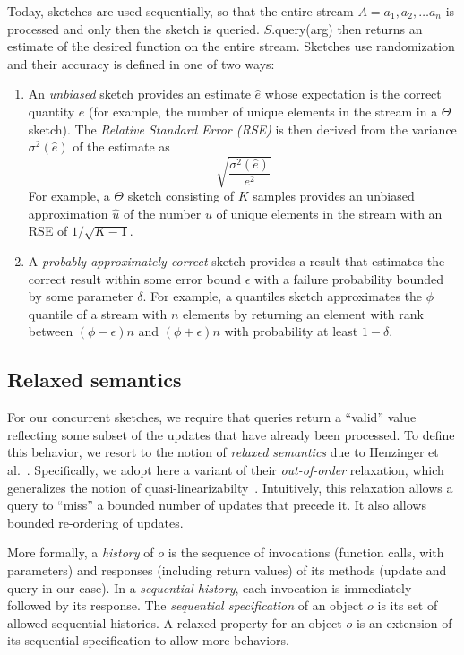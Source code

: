 Today, sketches are used sequentially, so that the entire stream $A = a_1, a_2, \dots a_n$ is processed 
and only then the sketch is queried. $S$.query(arg) then returns an estimate of the desired function 
on the entire stream. 
Sketches use randomization and their accuracy is defined in one of two ways:
\begin{enumerate}
\item An \emph{unbiased} sketch provides an estimate  $\hat{e}$ whose expectation is the correct quantity $e$ 
(for example, the number of unique elements in the stream in a $\Theta$ sketch).  
The \emph{Relative Standard Error (RSE)} is then derived from the variance $\sigma^2(\hat{e})$  of the estimate
as 
\[ \sqrt {\frac{\sigma^2(\hat{e})}{e^2}} \]
For example, a $\Theta$ sketch consisting of  $K$ samples provides an unbiased approximation $\hat{u}$ of the 
number $u$ of unique elements in the stream with an RSE of $1/\sqrt{K-1}$.

\item A \emph{probably approximately correct} sketch provides a result that estimates the correct result
within some error bound $\epsilon$ with a failure probability bounded by some parameter $\delta$.  
For example, a quantiles sketch approximates the $\phi$ quantile of a stream with  $n$ elements 
by returning an element with rank between $(\phi-\epsilon)n$ and  $(\phi+\epsilon)n$ with 
probability at least $1-\delta$.

\end{enumerate} 

\subsection{Relaxed semantics}
\label{sec:rsemantics}

For our concurrent sketches, we require that queries return a ``valid'' value reflecting some subset of the updates that have 
already been processed. %
To define this behavior, we resort to the notion of \emph{relaxed semantics}  due to Henzinger et al.~\cite{Henzinger}.
Specifically, we adopt here a variant of their {\emph{out-of-order}} relaxation,  
which generalizes the notion of quasi-linearizabilty~\cite{Afek}.
Intuitively, this relaxation allows a query to ``miss'' a bounded number of updates that precede it.
It also allows bounded re-ordering of updates.

More formally, 
a \emph{history} of $o$ is the sequence of invocations (function calls, with parameters) and responses 
(including return values) of its methods (update and query in our case). %
In a \emph{sequential history}, each invocation is immediately followed by its response.
The \emph{sequential specification} of an object $o$ is its set of allowed sequential histories.
A relaxed property for an object $o$ is an extension of its sequential specification to allow more behaviors.

